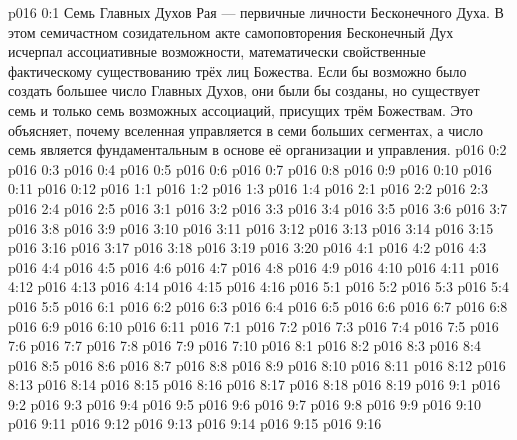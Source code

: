\author{Всеобщий Цензор}
\vs p016 0:1 Семь Главных Духов Рая --- первичные личности Бесконечного Духа. В этом семичастном созидательном акте самоповторения Бесконечный Дух исчерпал ассоциативные возможности, математически свойственные фактическому существованию трёх лиц Божества. Если бы возможно было создать большее число Главных Духов, они были бы созданы, но существует семь и только семь возможных ассоциаций, присущих трём Божествам. Это объясняет, почему вселенная управляется в семи больших сегментах, а число семь является фундаментальным в основе её организации и управления.
\vs p016 0:2 
\vs p016 0:3 
\vs p016 0:4 
\vs p016 0:5 
\vs p016 0:6 
\vs p016 0:7 
\vs p016 0:8 
\vs p016 0:9 
\vs p016 0:10 \pc 
\vs p016 0:11 
\vs p016 0:12 
\vs p016 1:1 
\vs p016 1:2 
\vs p016 1:3 
\vs p016 1:4 
\vs p016 2:1 
\vs p016 2:2 
\vs p016 2:3 \pc 
\vs p016 2:4 \pc 
\vs p016 2:5 
\vs p016 3:1 
\vs p016 3:2 
\vs p016 3:3 
\vs p016 3:4 \pc 
\vs p016 3:5 
\vs p016 3:6 \pc 
\vs p016 3:7 
\vs p016 3:8 \pc 
\vs p016 3:9 
\vs p016 3:10 \pc 
\vs p016 3:11 
\vs p016 3:12 \pc 
\vs p016 3:13 
\vs p016 3:14 \pc 
\vs p016 3:15 
\vs p016 3:16 
\vs p016 3:17 
\vs p016 3:18 
\vs p016 3:19 
\vs p016 3:20 
\vs p016 4:1 
\vs p016 4:2 
\vs p016 4:3 
\vs p016 4:4 
\vs p016 4:5 
\vs p016 4:6 
\vs p016 4:7 
\vs p016 4:8 \pc 
\vs p016 4:9 
\vs p016 4:10 
\vs p016 4:11 
\vs p016 4:12 
\vs p016 4:13 
\vs p016 4:14 
\vs p016 4:15 
\vs p016 4:16 \pc 
{}
\vs p016 5:1 
\vs p016 5:2 
\vs p016 5:3 
\vs p016 5:4 
\vs p016 5:5 
\vs p016 6:1 
\vs p016 6:2 
\vs p016 6:3 
\vs p016 6:4 \pc 
\vs p016 6:5 
\vs p016 6:6 
\vs p016 6:7 
\vs p016 6:8 
\vs p016 6:9 \pc 
\vs p016 6:10 \pc 
\vs p016 6:11 
\vs p016 7:1 
\vs p016 7:2 
\vs p016 7:3 
\vs p016 7:4 
\vs p016 7:5 
\vs p016 7:6 \pc 
\vs p016 7:7 
\vs p016 7:8 \pc 
\vs p016 7:9 \pc 
\vs p016 7:10 
\vs p016 8:1 
\vs p016 8:2 
\vs p016 8:3 
\vs p016 8:4 
\vs p016 8:5 \pc 
\vs p016 8:6 
\vs p016 8:7 \pc 
\vs p016 8:8 
\vs p016 8:9 
\vs p016 8:10 
\vs p016 8:11 
\vs p016 8:12 
\vs p016 8:13 
\vs p016 8:14 
\vs p016 8:15 \pc 
\vs p016 8:16 
\vs p016 8:17 
\vs p016 8:18 
\vs p016 8:19 \pc 
{}
\vs p016 9:1 
\vs p016 9:2 
\vs p016 9:3 
\vs p016 9:4 \pc 
\vs p016 9:5 
\vs p016 9:6 
\vs p016 9:7 \pc 
\vs p016 9:8 
\vs p016 9:9 
\vs p016 9:10 
\vs p016 9:11 
\vs p016 9:12 
\vs p016 9:13 
\vs p016 9:14 \pc 
\vs p016 9:15 
\vsetoff
\vs p016 9:16 
\quizlink

